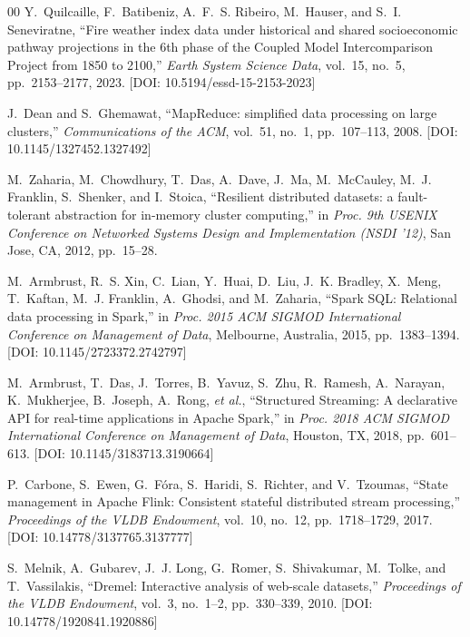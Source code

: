 \documentclass[10pt,conference]{IEEEtran}
\begin{document}
\begin{thebibliography}{00}
Y.~Quilcaille, F.~Batibeniz, A.~F.~S. Ribeiro, M.~Hauser, and S.~I. Seneviratne, ``Fire weather index data under historical and shared socioeconomic pathway projections in the 6th phase of the Coupled Model Intercomparison Project from 1850 to 2100,'' \textit{Earth System Science Data}, vol.~15, no.~5, pp.~2153--2177, 2023. [DOI: 10.5194/essd-15-2153-2023]

J.~Dean and S.~Ghemawat, ``MapReduce: simplified data processing on large clusters,'' \textit{Communications of the ACM}, vol.~51, no.~1, pp.~107--113, 2008. [DOI: 10.1145/1327452.1327492]

M.~Zaharia, M.~Chowdhury, T.~Das, A.~Dave, J.~Ma, M.~McCauley, M.~J. Franklin, S.~Shenker, and I.~Stoica, ``Resilient distributed datasets: a fault-tolerant abstraction for in-memory cluster computing,'' in \textit{Proc. 9th USENIX Conference on Networked Systems Design and Implementation (NSDI '12)}, San Jose, CA, 2012, pp.~15--28.

M.~Armbrust, R.~S. Xin, C.~Lian, Y.~Huai, D.~Liu, J.~K. Bradley, X.~Meng, T.~Kaftan, M.~J. Franklin, A.~Ghodsi, and M.~Zaharia, ``Spark SQL: Relational data processing in Spark,'' in \textit{Proc. 2015 ACM SIGMOD International Conference on Management of Data}, Melbourne, Australia, 2015, pp.~1383--1394. [DOI: 10.1145/2723372.2742797]

M.~Armbrust, T.~Das, J.~Torres, B.~Yavuz, S.~Zhu, R.~Ramesh, A.~Narayan, K.~Mukherjee, B.~Joseph, A.~Rong, \textit{et al.}, ``Structured Streaming: A declarative API for real-time applications in Apache Spark,'' in \textit{Proc. 2018 ACM SIGMOD International Conference on Management of Data}, Houston, TX, 2018, pp.~601--613. [DOI: 10.1145/3183713.3190664]

P.~Carbone, S.~Ewen, G.~F\'ora, S.~Haridi, S.~Richter, and V.~Tzoumas, ``State management in Apache Flink: Consistent stateful distributed stream processing,'' \textit{Proceedings of the VLDB Endowment}, vol.~10, no.~12, pp.~1718--1729, 2017. [DOI: 10.14778/3137765.3137777]

S.~Melnik, A.~Gubarev, J.~J. Long, G.~Romer, S.~Shivakumar, M.~Tolke, and T.~Vassilakis, ``Dremel: Interactive analysis of web-scale datasets,'' \textit{Proceedings of the VLDB Endowment}, vol.~3, no.~1--2, pp.~330--339, 2010. [DOI: 10.14778/1920841.1920886]


\end{thebibliography}
\end{document}

